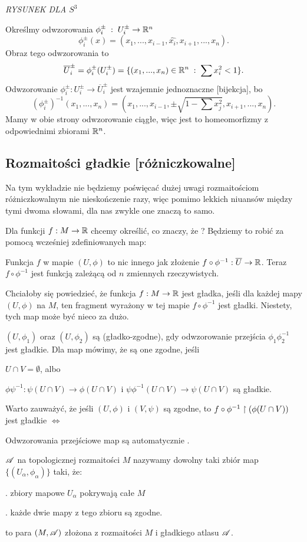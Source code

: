 \emph{\Large\color{red}RYSUNEK DLA $S^3$}

Określmy odwzorowania $\phi^\pm_i\;:\;U_i^\pm\to\mathbb{R}^n$
$$\phi_i^\pm(x)=(x_1,...,x_{i-1},\hat{x_i},x_{i+1},...,x_n).$$
Obraz tego odwzorowania to
$$\overline U_i^\pm=\phi_i^\pm(U_i^\pm)=\{(x_1,...,x_n)\in \mathbb{R}^n\;:\;\sum x_i^2<1\}.$$
Odwzorowanie $\phi_i^\pm: U_i^\pm\to\overline U_i^\pm$ jest wzajemnie jednoznaczne [bijekcja], bo
$$(\phi_i^\pm)^{-1}(x_1,...,x_n)=(x_1,...,x_{i-1}, \pm\sqrt{1-\sum x_j^2}, x_{i+1},...,x_n).$$
Mamy w obie strony odwzorowanie ciągłe, więc jest to homeomorfizmy z odpowiednimi zbiorami $\mathbb{R}^n$.

\subsection{Rozmaitości gładkie [różniczkowalne]}

Na tym wykładzie nie będziemy poświęcać dużej uwagi rozmaitościom różniczkowalnym nie nieskończenie razy, więc pomimo lekkich niuansów między tymi dwoma słowami, dla nas zwykle one znaczą to samo.
\medskip

Dla funkcji $f:M\to\mathbb{R}$ chcemy określić, co znaczy, że ? Będziemy to robić za pomocą wcześniej zdefiniowanych map:

\indent \point Funkcja $f$  w mapie $(U, \phi)$ to nic innego jak złożenie $f\circ \phi^{-1}:\overline U\to \mathbb{R}$. Teraz $f\circ\phi^{-1}$ jest funkcją zależącą od $n$ zmiennych rzeczywistych.

\indent \point Chciałoby się powiedzieć, że funkcja $f: M\to\mathbb{R}$ jest gładka, jeśli dla każdej mapy $(U, \phi)$ na $M$, ten fragment wyrażony w tej mapie $f\circ\phi^{-1}$ jest gładki. Niestety, tych map może być nieco za dużo.

\indent \point {}
\medskip

 $(U, \phi_1)$ oraz $(U, \phi_2)$ są  (gładko-zgodne), gdy odwzorowanie przejścia $\phi_1\phi_2^{-1}$ jest gładkie. Dla map  mówimy, że są one zgodne, jeśli 

\indent \point $U\cap V=\emptyset$, albo

\indent \point $\phi\psi^{-1}:\psi(U\cap V)\to \phi(U\cap V)$ i $\psi\phi^{-1}(U\cap V)\to \psi(U\cap V)$ są gładkie.

Warto zauważyć, że jeśli $(U, \phi)$ i $(V, \psi)$ są zgodne, to $f\circ\phi^{-1}\upharpoonright (\phi(U\cap V))$ jest gładkie $\iff$

Odwzorowania przejściowe map są automatycznie .
\medskip

 $\mathcal{A}$ na topologicznej rozmaitości $M$ nazywamy dowolny taki zbiór map $\{(U_\alpha,\phi_\alpha)\}$ taki, że:
\smallskip

. zbiory mapowe $U_\alpha$ pokrywają całe $M$

. każde dwie mapy z tego zbioru są zgodne.
\medskip

 to para $(M, \mathcal{A})$ złożona z rozmaitości $M$ i gładkiego atlasu $\mathcal{A}$.